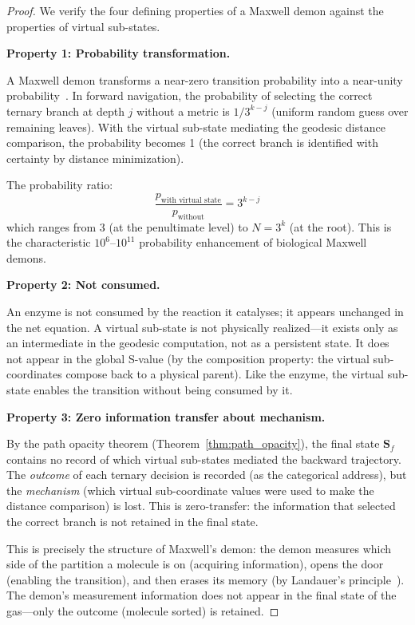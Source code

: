 \documentclass[12pt,twocolumn]{article}
\begin{document}
\begin{proof}
We verify the four defining properties of a Maxwell demon against the properties of virtual sub-states.

\textbf{Property 1: Probability transformation.}

A Maxwell demon transforms a near-zero transition probability into a near-unity probability~\cite{mizraji2021biological}. In forward navigation, the probability of selecting the correct ternary branch at depth $j$ without a metric is $1/3^{k-j}$ (uniform random guess over remaining leaves). With the virtual sub-state mediating the geodesic distance comparison, the probability becomes 1 (the correct branch is identified with certainty by distance minimization).

The probability ratio:
\begin{equation}
\frac{p_{\text{with virtual state}}}{p_{\text{without}}} = 3^{k-j}
\end{equation}
which ranges from 3 (at the penultimate level) to $N = 3^k$ (at the root). This is the characteristic $10^6$--$10^{11}$ probability enhancement of biological Maxwell demons.

\textbf{Property 2: Not consumed.}

An enzyme is not consumed by the reaction it catalyses; it appears unchanged in the net equation. A virtual sub-state is not physically realized---it exists only as an intermediate in the geodesic computation, not as a persistent state. It does not appear in the global S-value (by the composition property: the virtual sub-coordinates compose back to a physical parent). Like the enzyme, the virtual sub-state enables the transition without being consumed by it.

\textbf{Property 3: Zero information transfer about mechanism.}

By the path opacity theorem (Theorem~\ref{thm:path_opacity}), the final state $\mathbf{S}_f$ contains no record of which virtual sub-states mediated the backward trajectory. The \emph{outcome} of each ternary decision is recorded (as the categorical address), but the \emph{mechanism} (which virtual sub-coordinate values were used to make the distance comparison) is lost. This is zero-transfer: the information that selected the correct branch is not retained in the final state.

This is precisely the structure of Maxwell's demon: the demon measures which side of the partition a molecule is on (acquiring information), opens the door (enabling the transition), and then erases its memory (by Landauer's principle~\cite{landauer1961irreversibility,bennett1982thermodynamics}). The demon's measurement information does not appear in the final state of the gas---only the outcome (molecule sorted) is retained.


\end{proof}
\end{document}
